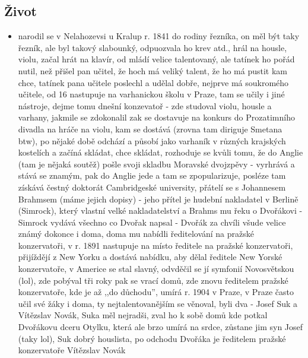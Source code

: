 \documentclass{article}
\begin{document}
\subsection{Život}
\begin{itemize}
  \item narodil se v Nelahozevsi u Kralup r. 1841 do rodiny řezníka, on měl být taky řezník, ale byl takový slabounký, odpuozvala ho krev atd., hrál na housle, violu, začal hrát na klavír, od mládí velice talentovaný, ale tatínek ho pořád nutil, než přišel pan učitel, že hoch má veliký talent, že ho má pustit kam chce, tatínek pana učitele poslechl a udělal dobře, nejprve má soukromého učitele, od 16 nastupuje na varhanickou školu v Praze, tam se učily i jiné nástroje, dejme tomu dnešní konzevatoř - zde studoval violu, housle a varhany, jakmile se zdokonalil zak se dostavuje na konkurs do Prozatimního divadla na hráče na violu, kam se dostává (zrovna tam diriguje Smetana btw), po nějaké době odchází a působí jako varhaník v různých krajských kostelích a začíná skládat, chce skládat, rozhoduje se kvůli tomu, že do Anglie (tam je nějaká soutěž) pošle svoji skladbu Moravské dvojzpěvy - vyrhrává a stává se znamým, pak do Anglie jede a tam se zpopularizuje, posléze tam získává čestný doktorát Cambridgeské university, přátelí se s Johannesem Brahmsem (máme jejich dopisy) - jeho přítel je hudební nakladatel v Berlině (Simrock), který vlastní velké nakladatelství a Brahms mu řeku o Dvořákovi - Simrock vydává všechno co Dvořak napsal - Dvořák za chvíli všude velice známý dokonce i doma, doma mu nabídli ředitelování na pražské konzervatoři, v r. 1891 nastupuje na místo ředitele na pražské konzervatoři, přijíždějí z New Yorku a dostává nabídku, aby dělal ředitele New Yorské konzervatoře, v Americe se stal slavný, odvděčil se jí symfonií Novosvětskou (lol), zde pobýval tři roky pak se vrací domů, zde znovu ředitelem pražské konzervatoře, kde je až ,,do důchodu”, umírá r. 1904 v Praze, v Praze často učil své žáky i doma, ty nejtalentovanějším se věnoval, byli dva - Josef Suk a Vítězslav Novák, Suka měl nejradši, zval ho k sobě domů kde potkal Dvořákovu dceru Otylku, která ale brzo umírá na srdce, zůstane jim syn Josef (taky lol), Suk dobrý houslista, po odchodu Dvořáka je ředitelem pražské konzervatoře Vítězslav Novák
\end{itemize}
\end{document}
